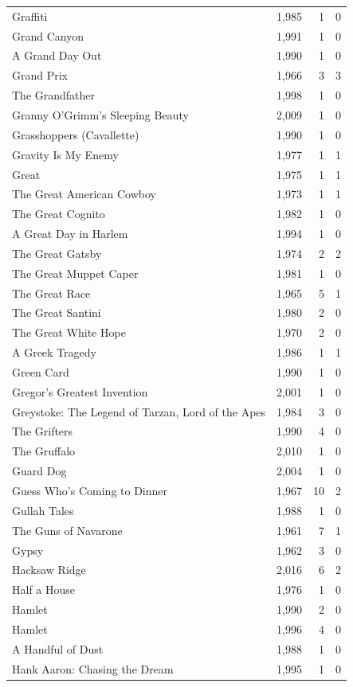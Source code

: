 \begin{tabular}{lrrr}
Graffiti & 1,985 & 1 & 0 \\
Grand Canyon & 1,991 & 1 & 0 \\
A Grand Day Out & 1,990 & 1 & 0 \\
Grand Prix & 1,966 & 3 & 3 \\
The Grandfather & 1,998 & 1 & 0 \\
Granny O'Grimm's Sleeping Beauty & 2,009 & 1 & 0 \\
Grasshoppers (Cavallette) & 1,990 & 1 & 0 \\
Gravity Is My Enemy & 1,977 & 1 & 1 \\
Great & 1,975 & 1 & 1 \\
The Great American Cowboy & 1,973 & 1 & 1 \\
The Great Cognito & 1,982 & 1 & 0 \\
A Great Day in Harlem & 1,994 & 1 & 0 \\
The Great Gatsby & 1,974 & 2 & 2 \\
The Great Muppet Caper & 1,981 & 1 & 0 \\
The Great Race & 1,965 & 5 & 1 \\
The Great Santini & 1,980 & 2 & 0 \\
The Great White Hope & 1,970 & 2 & 0 \\
A Greek Tragedy & 1,986 & 1 & 1 \\
Green Card & 1,990 & 1 & 0 \\
Gregor's Greatest Invention & 2,001 & 1 & 0 \\
Greystoke: The Legend of Tarzan, Lord of the Apes & 1,984 & 3 & 0 \\
The Grifters & 1,990 & 4 & 0 \\
The Gruffalo & 2,010 & 1 & 0 \\
Guard Dog & 2,004 & 1 & 0 \\
Guess Who's Coming to Dinner & 1,967 & 10 & 2 \\
Gullah Tales & 1,988 & 1 & 0 \\
The Guns of Navarone & 1,961 & 7 & 1 \\
Gypsy & 1,962 & 3 & 0 \\
Hacksaw Ridge & 2,016 & 6 & 2 \\
Half a House & 1,976 & 1 & 0 \\
Hamlet & 1,990 & 2 & 0 \\
Hamlet & 1,996 & 4 & 0 \\
A Handful of Dust & 1,988 & 1 & 0 \\
Hank Aaron: Chasing the Dream & 1,995 & 1 & 0 \\

\end{tabular}
